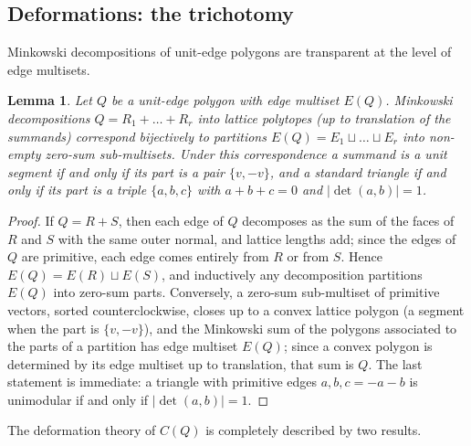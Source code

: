 \documentclass[11pt]{amsart}
\newtheorem{lemma}[theorem]{Lemma}
\theoremstyle{definition}
\theoremstyle{remark}
\begin{document}
\subsection{Deformations: the trichotomy}
Minkowski decompositions of unit-edge polygons are transparent at the level of
edge multisets.

\begin{lemma}\label{lem:partition}
Let $Q$ be a unit-edge polygon with edge multiset $E(Q)$.  Minkowski
decompositions $Q = R_1 + \dots + R_r$ into lattice polytopes (up to
translation of the summands) correspond bijectively to partitions
$E(Q)=E_1\sqcup\dots\sqcup E_r$ into non-empty zero-sum sub-multisets.  Under
this correspondence a summand is a unit segment if and only if its part is a
pair $\{v,-v\}$, and a standard triangle if and only if its part is a triple
$\{a,b,c\}$ with $a+b+c=0$ and $|\det(a,b)|=1$.
\end{lemma}

\begin{proof}
If $Q = R + S$, then each edge of $Q$ decomposes as the sum of the faces of
$R$ and $S$ with the same outer normal, and lattice lengths add; since the
edges of $Q$ are primitive, each edge comes entirely from $R$ or from $S$.
Hence $E(Q) = E(R) \sqcup E(S)$, and inductively any decomposition partitions
$E(Q)$ into zero-sum parts.  Conversely, a zero-sum sub-multiset of primitive
vectors, sorted counterclockwise, closes up to a convex lattice polygon
(a segment when the part is $\{v,-v\}$), and the Minkowski sum of the polygons
associated to the parts of a partition has edge multiset $E(Q)$; since a
convex polygon is determined by its edge multiset up to translation, that sum
is $Q$.  The last statement is immediate: a triangle with primitive edges
$a,b,c=-a-b$ is unimodular if and only if $|\det(a,b)|=1$.
\end{proof}

The deformation theory of $C(Q)$ is completely described by two results.
\end{document}
